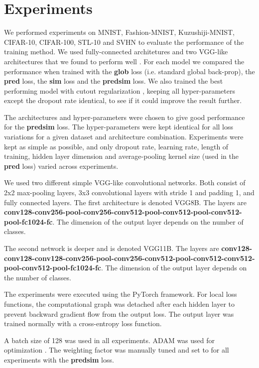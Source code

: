 \documentclass{article}
\begin{document}
\section{Experiments}

We performed experiments on MNIST, Fashion-MNIST, Kuzushiji-MNIST, CIFAR-10, CIFAR-100, STL-10 and SVHN to evaluate the performance of the training method. We used fully-connected architetures and two VGG-like architectures that we found to perform well \cite{SimonyanZ14a}. For each model we compared the performance when trained with the \textbf{glob} loss (i.e. standard global back-prop), the \textbf{pred} loss, the \textbf{sim} loss and the \textbf{predsim} loss. We also trained the best performing model with cutout regularization \cite{DevriesT17}, keeping all hyper-parameters except the dropout rate identical, to see if it could improve the result further.

The architectures and hyper-parameters were chosen to give good performance for the \textbf{predsim} loss. The hyper-parameters were kept identical for all loss variations for a given dataset and architecture combination. Experiments were kept as simple as possible, and only dropout rate, learning rate, length of training, hidden layer dimension and average-pooling kernel size (used in the \textbf{pred} loss) varied across experiments.

We used two different simple VGG-like convolutional networks. Both consist of 2x2 max-pooling layers, 3x3 convolutional layers with stride 1 and padding 1, and fully connected layers. The first architecture is denoted VGG8B. The layers are \textbf{conv128-conv256-pool-conv256-conv512-pool-conv512-pool-conv512-pool-fc1024-fc}. The dimension of the output layer depends on the number of classes. 

The second network is deeper and is denoted VGG11B. The layers are \textbf{conv128-conv128-conv128-conv256-pool-conv256-conv512-pool-conv512-conv512-pool-conv512-pool-fc1024-fc}. The dimension of the output layer depends on the number of classes.

The experiments were executed using the PyTorch framework. For local loss functions, the computational graph was detached after each hidden layer to prevent backward gradient flow from the output loss. The output layer was trained normally with a cross-entropy loss function. 

A batch size of 128 was used in all experiments. ADAM was used for optimization \cite{KingmaB14}. The weighting factor  was manually tuned and set to  for all experiments with the \textbf{predsim} loss.
\end{document}
